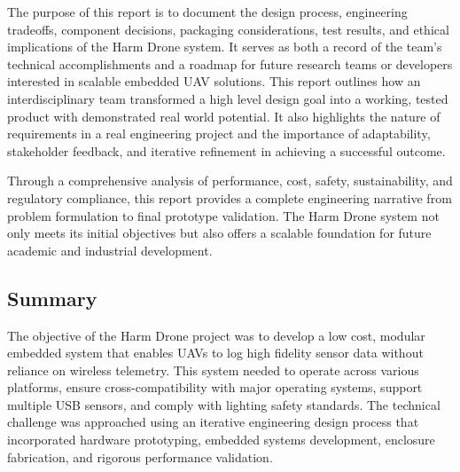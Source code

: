 \documentclass[12pt]{article}
\begin{document}
\par The purpose of this report is to document the design process, engineering tradeoffs, component decisions, packaging considerations, test results, and ethical implications of the Harm Drone system. It serves as both a record of the team’s technical accomplishments and a roadmap for future research teams or developers interested in scalable embedded UAV solutions. This report outlines how an interdisciplinary team transformed a high level design goal into a working, tested product with demonstrated real world potential. It also highlights the nature of requirements in a real engineering project and the importance of adaptability, stakeholder feedback, and iterative refinement in achieving a successful outcome.

\par Through a comprehensive analysis of performance, cost, safety, sustainability, and regulatory compliance, this report provides a complete engineering narrative from problem formulation to final prototype validation. The Harm Drone system not only meets its initial objectives but also offers a scalable foundation for future academic and industrial development.

\subsection*{Summary}

\par The objective of the Harm Drone project was to develop a low cost, modular embedded system that enables UAVs to log high fidelity sensor data without reliance on wireless telemetry. This system needed to operate across various platforms, ensure cross-compatibility with major operating systems, support multiple USB sensors, and comply with lighting safety standards. The technical challenge was approached using an iterative engineering design process that incorporated hardware prototyping, embedded systems development, enclosure fabrication, and rigorous performance validation.
\end{document}
